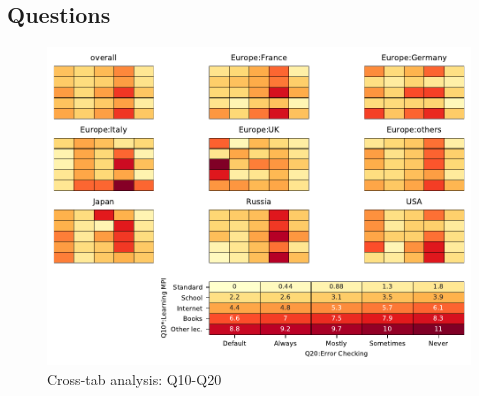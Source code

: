 
\subsection{Questions}


\begin{figure}
\begin{center}
\includegraphics[width=12cm]{../pdfs/Q10-Q20.pdf}
\caption{Cross-tab analysis: Q10-Q20}
\label{fig:Q10-Q20}
\end{center}
\end{figure}
